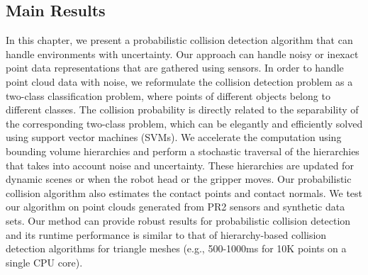 \subsection{Main Results}
In this chapter, we present a probabilistic collision detection algorithm that can handle environments with uncertainty.
Our approach can handle noisy or inexact point data representations that are gathered using sensors.
In order to handle point cloud data with noise, we reformulate the collision detection problem as a two-class classification problem,
where points of different objects belong to different classes. The collision probability is directly related to the separability of the corresponding
two-class problem, which can be elegantly and efficiently solved using support vector machines (SVMs).
We accelerate the computation using bounding volume hierarchies and perform a stochastic traversal of the hierarchies that takes into account noise and
uncertainty. These hierarchies are updated for dynamic scenes or when the robot head or the gripper moves.
Our probabilistic collision algorithm also estimates the contact points and contact normals.
We test our algorithm on point clouds generated from PR2 sensors and synthetic data sets. Our method can provide robust results for probabilistic collision detection and its runtime performance is similar to that of hierarchy-based collision detection algorithms for triangle meshes (e.g., 500-1000ms for 10K points on a single CPU core).



